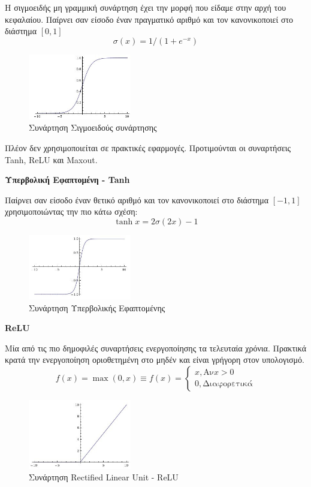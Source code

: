 Η σιγμοειδής μη γραμμική συνάρτηση έχει την μορφή που είδαμε στην αρχή του κεφαλαίου.
Παίρνει σαν είσοδο έναν πραγματικό αριθμό και τον κανονικοποιεί στο διάστημα $[0, 1]$
\[
  \sigma(x) = 1 / (1 + e^{-x})
\]

\begin{figure}[!ht]
  \centering
  \includegraphics[width=0.4\textwidth]{./images/chapter3/sigmoid.jpg}
  \caption[Συνάρτηση Σιγμοειδούς συνάρτησης]{Συνάρτηση Σιγμοειδούς συνάρτησης}
  \label{fig:sigmoid}
\end{figure}

Πλέον δεν χρησιμοποιείται σε πρακτικές εφαρμογές. Προτιμούνται οι συναρτήσεις
Tanh, ReLU και Maxout.

\textbf{Υπερβολική Εφαπτομένη - Tanh}

Παίρνει σαν είσοδο έναν θετικό αριθμό και τον κανονικοποιεί στο διάστημα $[-1, 1]$
χρησιμοποιώντας την πιο κάτω σχέση:
\[
  \tanh{x} = 2\sigma(2x) - 1
\]

\begin{figure}[!ht]
  \centering
  \includegraphics[width=0.4\textwidth]{./images/chapter3/tanh.jpg}
  \caption[Συνάρτηση Υπερβολικής Εφαπτωμένης]{Συνάρτηση Υπερβολικής Εφαπτομένης}
  \label{fig:tanh}
\end{figure}

\textbf{ReLU}

Μία από τις πιο δημοφιλές συναρτήσεις ενεργοποίησης τα τελευταία χρόνια.
Πρακτικά κρατά την ενεργοποίηση οριοθετημένη στο μηδέν και είναι
γρήγορη στον υπολογισμό.
\[
  f(x) = \max(0, x) \equiv f(x) =
  \begin{cases}
    x, \text{Αν} x > 0 \\
    0, \text{Διαφορετικά}
  \end{cases}
\]

\begin{figure}[!ht]
  \centering
  \includegraphics[width=0.4\textwidth]{./images/chapter3/relu.jpg}
  \caption[Συνάρτηση Rectified Linear Unit - ReLU]{Συνάρτηση Rectified Linear Unit - ReLU}
  \label{fig:tanh}
\end{figure}

